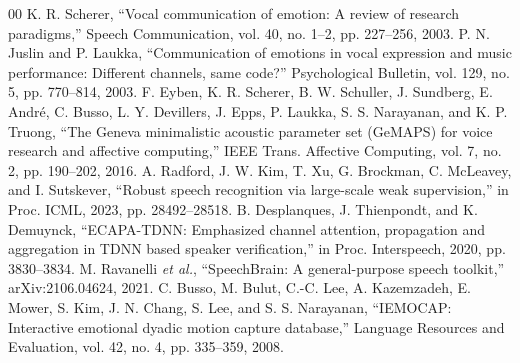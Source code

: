 \documentclass[conference]{IEEEtran}
\begin{document}
\begin{thebibliography}{00}
 K. R. Scherer, ``Vocal communication of emotion: A review of research paradigms,'' Speech Communication, vol. 40, no. 1--2, pp. 227--256, 2003.
 P. N. Juslin and P. Laukka, ``Communication of emotions in vocal expression and music performance: Different channels, same code?'' Psychological Bulletin, vol. 129, no. 5, pp. 770--814, 2003.
 F. Eyben, K. R. Scherer, B. W. Schuller, J. Sundberg, E. Andr\'e, C. Busso, L. Y. Devillers, J. Epps, P. Laukka, S. S. Narayanan, and K. P. Truong, ``The Geneva minimalistic acoustic parameter set (GeMAPS) for voice research and affective computing,'' IEEE Trans. Affective Computing, vol. 7, no. 2, pp. 190--202, 2016.
 A. Radford, J. W. Kim, T. Xu, G. Brockman, C. McLeavey, and I. Sutskever, ``Robust speech recognition via large-scale weak supervision,'' in Proc. ICML, 2023, pp. 28492--28518.
 B. Desplanques, J. Thienpondt, and K. Demuynck, ``ECAPA-TDNN: Emphasized channel attention, propagation and aggregation in TDNN based speaker verification,'' in Proc. Interspeech, 2020, pp. 3830--3834.
 M. Ravanelli \textit{et al.}, ``SpeechBrain: A general-purpose speech toolkit,'' arXiv:2106.04624, 2021.
 C. Busso, M. Bulut, C.-C. Lee, A. Kazemzadeh, E. Mower, S. Kim, J. N. Chang, S. Lee, and S. S. Narayanan, ``IEMOCAP: Interactive emotional dyadic motion capture database,'' Language Resources and Evaluation, vol. 42, no. 4, pp. 335--359, 2008.
\end{thebibliography}
\end{document}
